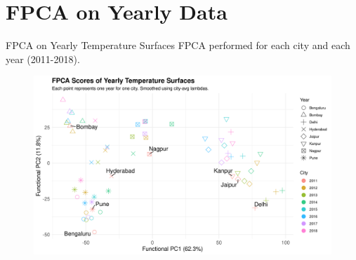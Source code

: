 \documentclass[svgnames, 12pt]{beamer}
\begin{document}
\section{FPCA on Yearly Data}
\begin{frame}{FPCA on Yearly Temperature Surfaces}
  FPCA performed for each city and each year (2011-2018).
  \begin{figure}
    \includegraphics[width=0.9\linewidth]{../data/output/figures/pca_yearly_scores.png}
  \end{figure}
\end{frame}

\end{document}
